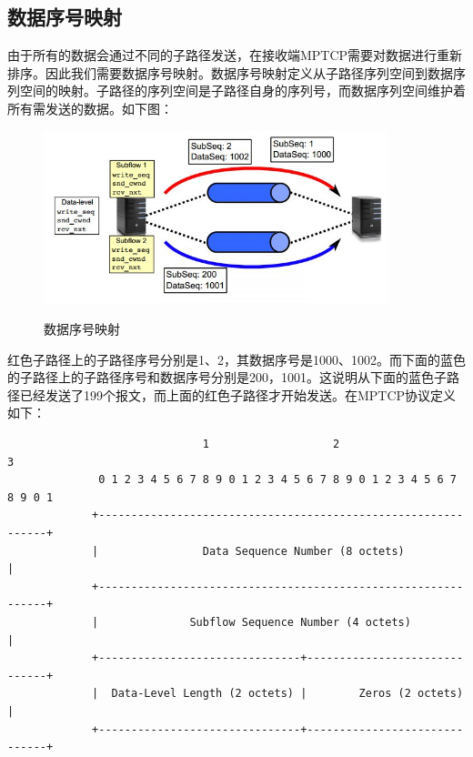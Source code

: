 \subsection{数据序号映射}
由于所有的数据会通过不同的子路径发送，在接收端MPTCP需要对数据进行重新排序。因此我们需要数据序号映射。数据序号映射定义从子路径序列空间到数据序列空间的映射。子路径的序列空间是子路径自身的序列号，而数据序列空间维护着所有需发送的数据。如下图：
\begin{figure}[H]
  \centering
  \includegraphics[width=10cm]{dias/Data-Sequence-Mapping.jpg}\\
  \caption{数据序号映射}
\end{figure}
红色子路径上的子路径序号分别是1、2，其数据序号是1000、1002。而下面的蓝色的子路径上的子路径序号和数据序号分别是200，1001。这说明从下面的蓝色子路径已经发送了199个报文，而上面的红色子路径才开始发送。在MPTCP协议定义如下：
\small\begin{verbatim}
                              1                   2                   3
              0 1 2 3 4 5 6 7 8 9 0 1 2 3 4 5 6 7 8 9 0 1 2 3 4 5 6 7 8 9 0 1
             +--------------------------------------------------------------+
             |                Data Sequence Number (8 octets)               |
             +--------------------------------------------------------------+
             |              Subflow Sequence Number (4 octets)              |
             +-------------------------------+------------------------------+
             |  Data-Level Length (2 octets) |        Zeros (2 octets)      |
             +-------------------------------+------------------------------+
\end{verbatim}\normalsize

